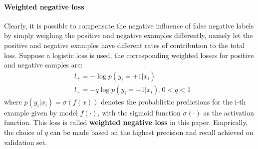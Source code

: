 
\paragraph{Weighted negative loss}

Clearly, it is possible to compensate the negative influence of false negative labels by simply weighing the positive and negative examples differently, namely let the positive and negative examples have different rates of contribution to the total loss.
Suppose a logistic loss is used, the corresponding weighted losses for positive and negative samples are:
\begin{equation*}
  \begin{aligned}
    & l_{+} = - \log p(y_i=+1|x_i) \\
    & l_{-} = - q \log p(y_i=-1 \vert x_i), 0<q<1
  \end{aligned}
\end{equation*}
where $p(y_i \vert x_i)=\sigma(f(x))$ denotes the probablistic predictions for the i-th example given by model $f(\cdot)$, with the sigmoid function $\sigma(\cdot)$ as the activation function.
This loss is called \textbf{weighted negative loss} in this paper.
Emprically, the choice of $q$ can be made based on the highest precision and recall achieved on validation set.




